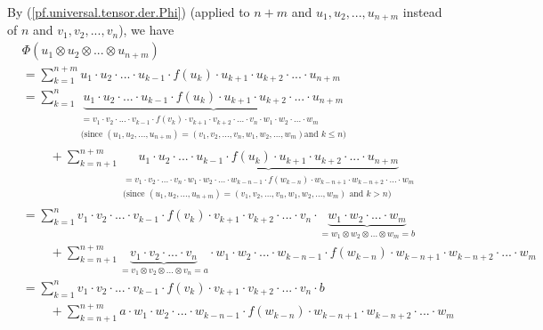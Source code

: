 \documentclass[etingof-lie.tex]{subfiles}
\begin{document}
By (\ref{pf.universal.tensor.der.Phi}) (applied to $n+m$ and $u_{1}%
,u_{2},...,u_{n+m}$ instead of $n$ and $v_{1},v_{2},...,v_{n}$), we have%
\begin{align*}
&  \Phi\left(  u_{1}\otimes u_{2}\otimes...\otimes u_{n+m}\right) \\
&  =\sum\limits_{k=1}^{n+m}u_{1}\cdot u_{2}\cdot...\cdot u_{k-1}\cdot f\left(
u_{k}\right)  \cdot u_{k+1}\cdot u_{k+2}\cdot...\cdot u_{n+m}\\
&  =\sum\limits_{k=1}^{n}\underbrace{u_{1}\cdot u_{2}\cdot...\cdot
u_{k-1}\cdot f\left(  u_{k}\right)  \cdot u_{k+1}\cdot u_{k+2}\cdot...\cdot
u_{n+m}}_{\substack{=v_{1}\cdot v_{2}\cdot...\cdot v_{k-1}\cdot f\left(
v_{k}\right)  \cdot v_{k+1}\cdot v_{k+2}\cdot...\cdot v_{n}\cdot w_{1}\cdot
w_{2}\cdot...\cdot w_{m}\\\text{(since }\left(  u_{1},u_{2},...,u_{n+m}%
\right)  =\left(  v_{1},v_{2},...,v_{n},w_{1},w_{2},...,w_{m}\right)  \text{
and }k\leq n\text{)}}}\\
&  \ \ \ \ \ \ \ \ \ \ +\sum\limits_{k=n+1}^{n+m}\underbrace{u_{1}\cdot
u_{2}\cdot...\cdot u_{k-1}\cdot f\left(  u_{k}\right)  \cdot u_{k+1}\cdot
u_{k+2}\cdot...\cdot u_{n+m}}_{\substack{=v_{1}\cdot v_{2}\cdot...\cdot
v_{n}\cdot w_{1}\cdot w_{2}\cdot...\cdot w_{k-n-1}\cdot f\left(
w_{k-n}\right)  \cdot w_{k-n+1}\cdot w_{k-n+2}\cdot...\cdot w_{m}%
\\\text{(since }\left(  u_{1},u_{2},...,u_{n+m}\right)  =\left(  v_{1}%
,v_{2},...,v_{n},w_{1},w_{2},...,w_{m}\right)  \text{ and }k>n\text{)}}}\\
&  =\sum\limits_{k=1}^{n}v_{1}\cdot v_{2}\cdot...\cdot v_{k-1}\cdot f\left(
v_{k}\right)  \cdot v_{k+1}\cdot v_{k+2}\cdot...\cdot v_{n}\cdot
\underbrace{w_{1}\cdot w_{2}\cdot...\cdot w_{m}}_{=w_{1}\otimes w_{2}%
\otimes...\otimes w_{m}=b}\\
&  \ \ \ \ \ \ \ \ \ \ +\sum\limits_{k=n+1}^{n+m}\underbrace{v_{1}\cdot
v_{2}\cdot...\cdot v_{n}}_{=v_{1}\otimes v_{2}\otimes...\otimes v_{n}=a}\cdot
w_{1}\cdot w_{2}\cdot...\cdot w_{k-n-1}\cdot f\left(  w_{k-n}\right)  \cdot
w_{k-n+1}\cdot w_{k-n+2}\cdot...\cdot w_{m}\\
&  =\sum\limits_{k=1}^{n}v_{1}\cdot v_{2}\cdot...\cdot v_{k-1}\cdot f\left(
v_{k}\right)  \cdot v_{k+1}\cdot v_{k+2}\cdot...\cdot v_{n}\cdot b\\
&  \ \ \ \ \ \ \ \ \ \ +\sum\limits_{k=n+1}^{n+m}a\cdot w_{1}\cdot w_{2}%
\cdot...\cdot w_{k-n-1}\cdot f\left(  w_{k-n}\right)  \cdot w_{k-n+1}\cdot
w_{k-n+2}\cdot...\cdot w_{m}\\

\end{align*}
\end{document}
